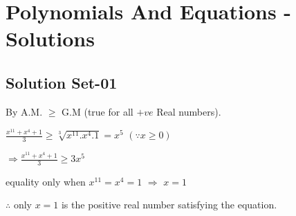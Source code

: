\chapter[Polynomials And Equations - Solutions]{Polynomials And Equations - Solutions}
\section[Solution Set-01]{Solution Set-01}

	\begin{solution}
		By A.M. $\ge$ G.M  (true for all $+ve$ Real numbers).

		$\frac{x^{11} + x^4 + 1}{3} \ge \sqrt[3]{x^{11} . x^4 . 1} = x^5$  $(\because x \ge 0)$

		$\Rightarrow \frac{x^11 + x^4 + 1}{3} \ge 3x^5$

		equality only when $x^{11} = x^4 = 1$  $\Rightarrow$ $x=1$

		$\therefore $ only $x=1$ is the positive real number satisfying the equation.
	\end{solution}

